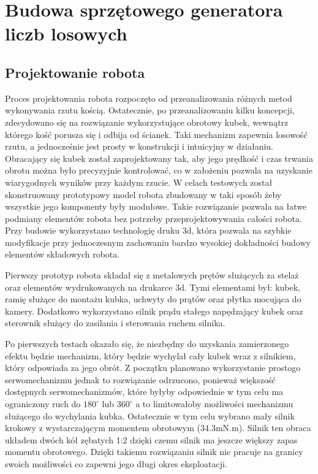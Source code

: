 
\chapter{Budowa sprzętowego generatora liczb losowych}
\section{Projektowanie robota}

Proces projektowania robota rozpoczęto od przeanalizowania różnych metod wykonywania rzutu kością.
Ostatecznie, po przeanalizowaniu kilku koncepcji, zdecydowano się na rozwiązanie wykorzystujące obrotowy 
kubek, wewnątrz którego kość porusza się i odbija od ścianek. Taki mechanizm zapewnia losowość rzutu, a 
jednocześnie jest prosty w konstrukcji i intuicyjny w działaniu. Obracający się kubek został 
zaprojektowany tak, aby jego prędkość i czas trwania obrotu można było precyzyjnie kontrolować, co  w założeniu 
pozwala na uzyskanie wiarygodnych wyników przy każdym rzucie. W celach testowych został skonstruowany prototypowy
model robota zbudowany w taki sposób żeby wszystkie jego komponenty były modułowe. Takie rozwiązanie pozwala na 
łatwe podmiany elementów robota bez potrzeby przeprojektowywania całości robota. Przy budowie wykorzystano 
technologię druku 3d, która pozwala na szybkie modyfikacje przy jednoczesnym zachowaniu bardzo wysokiej dokładności
budowy elementów składowych robota.

Pierwszy prototyp robota składał się z metalowych prętów służących za stelaż oraz elementów wydrukowanych na drukarce 3d.
Tymi elementami był: kubek, ramię służące do montażu kubka, uchwyty do prątów oraz płytka mocująca do kamery. Dodatkowo
wykorzystano silnik prądu stałego napędzający kubek oraz sterownik służący do zasilania i sterowania ruchem silnika.


Po pierwszych testach okazało się, że niezbędny do uzyskania zamierzonego efektu będzie mechanizm, który będzie 
wychylał cały kubek wraz z silnikiem, który odpowiada za jego obrót. Z początku planowano wykorzystanie prostogo
serwomechanizmu jednak to rozwiązanie odrzucono, ponieważ większość dostępnych serwomechanizmów, które byłyby odpowiednie w tym celu ma
ograniczony ruch do $180^{\circ}$ lub $360^{\circ}$ a to limitowałoby możliwości mechanizmu służącego do wychylania kubka.
Ostatecznie w tym celu wybrano mały silnik krokowy z wystarczającym momentem obrotowym (34.3mN.m). Silnik ten obraca 
układem dwóch kół zębatych 1:2 dzięki czemu silnik ma jeszcze większy zapas momentu obrotowego. Dzięki takiemu rozwiązaniu silnik
nie pracuje na granicy swoich możliwości co zapewni jego długi okres eksploatacji. 

